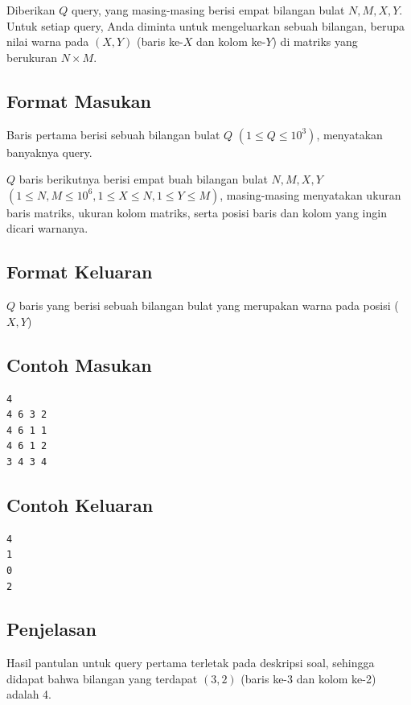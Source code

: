 \documentclass{article}
\begin{document}
Diberikan $Q$ query, yang masing-masing berisi empat bilangan bulat $N, M, X, Y$. Untuk setiap query, Anda diminta untuk mengeluarkan sebuah bilangan, berupa nilai warna pada $(X, Y)$ (baris ke-$X$ dan kolom ke-$Y$) di matriks yang berukuran $N \times M$.

\subsection*{Format Masukan}
Baris pertama berisi sebuah bilangan bulat $Q$ $(1 \leq Q \leq 10^3)$, menyatakan banyaknya query.

$Q$ baris berikutnya berisi empat buah bilangan bulat $N, M, X, Y$ $(1 \leq N, M \leq 10^6, 1 \leq X \leq N, 1 \leq Y \leq M)$, masing-masing menyatakan ukuran baris matriks, ukuran kolom matriks, serta posisi baris dan kolom yang ingin dicari warnanya.

\subsection*{Format Keluaran}
$Q$ baris yang berisi sebuah bilangan bulat yang merupakan warna pada posisi ($X, Y$)

\begin{multicols}{2}
\subsection*{Contoh Masukan}
\begin{lstlisting}
4
4 6 3 2
4 6 1 1
4 6 1 2
3 4 3 4 
\end{lstlisting}
\columnbreak
\subsection*{Contoh Keluaran}
\begin{lstlisting}
4
1
0
2
\end{lstlisting}
\vfill
\null
\end{multicols}

\subsection*{Penjelasan}
Hasil pantulan untuk query pertama terletak pada deskripsi soal, sehingga didapat bahwa bilangan yang terdapat $(3, 2)$ (baris ke-3 dan kolom ke-2) adalah 4.

\pagebreak
\end{document}
